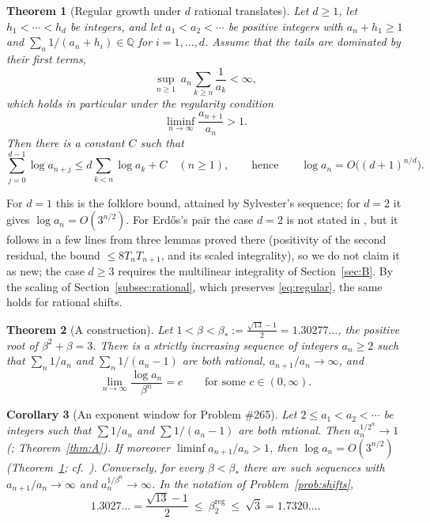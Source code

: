 \documentclass[11pt]{amsart}
\newtheorem{theorem}{Theorem}
\newtheorem{maincor}[theorem]{Corollary}
\theoremstyle{definition}
\theoremstyle{remark}
\newcommand{\Q}{\mathbb{Q}}
\begin{document}
\begin{theorem}[Regular growth under $d$ rational translates]\label{thm:B}
Let $d\ge1$, let $h_1<\cdots<h_d$ be integers, and let $a_1<a_2<\cdots$ be positive
integers with $a_n+h_1\ge1$ and $\sum_n 1/(a_n+h_i)\in\Q$ for $i=1,\dots,d$. Assume that the
tails are dominated by their first terms,
\begin{equation}\label{eq:tails}
\sup_{n\ge1}\ a_n\sum_{k\ge n}\frac1{a_k}<\infty ,
\end{equation}
which holds in particular under the regularity condition
\begin{equation}\label{eq:regular}
\liminf_{n\to\infty}\frac{a_{n+1}}{a_n}>1 .
\end{equation}
Then there is a constant $C$ such that
\[
\sum_{j=0}^{d-1}\log a_{n+j}\le d\sum_{k<n}\log a_k+C\quad(n\ge1),
\qquad\text{hence}\qquad \log a_n=O\bigl((d+1)^{n/d}\bigr).
\]
\end{theorem}

For $d=1$ this is the folklore bound, attained by Sylvester's sequence; for $d=2$ it
gives $\log a_n=O(3^{n/2})$. For Erd\H{o}s's pair the case $d=2$ is not stated in
\cite{Kit26}, but it follows in a few lines from three lemmas proved there (positivity of
the second residual, the bound $\le8T_nT_{n+1}$, and its scaled integrality), so we do not
claim it as new; the case $d\ge3$ requires the multilinear integrality of
Section~\ref{sec:B}. By the scaling of Section~\ref{subsec:rational}, which preserves
\eqref{eq:regular}, the same holds for rational shifts.

\begin{theorem}[A construction]\label{thm:C}
Let $1<\beta<\beta_*:=\frac{\sqrt{13}-1}{2}=1.30277\ldots$, the positive root of
$\beta^2+\beta=3$. There is a strictly increasing sequence of integers $a_n\ge2$ such
that $\sum_n1/a_n$ and $\sum_n1/(a_n-1)$ are both rational, $a_{n+1}/a_n\to\infty$, and
\[
\lim_{n\to\infty}\frac{\log a_n}{\beta^n}=c\qquad\text{for some }c\in(0,\infty).
\]
\end{theorem}

\begin{maincor}[An exponent window for Problem \#265]\label{cor:D}
Let $2\le a_1<a_2<\cdots$ be integers such that $\sum1/a_n$ and $\sum1/(a_n-1)$ are both
rational. Then $a_n^{1/2^n}\to 1$ \textup{(}\cite{Kit26}; Theorem~\ref{thm:A}\textup{)}.
If moreover $\liminf a_{n+1}/a_n>1$, then $\log a_n=O(3^{n/2})$ \textup{(}Theorem~\ref{thm:B};
cf.\ \cite{Kit26}\textup{)}. Conversely, for every
$\beta<\beta_*$ there are such sequences with $a_{n+1}/a_n\to\infty$ and
$a_n^{1/\beta^n}\to\infty$. In the notation of Problem~\ref{prob:shifts},
\[
1.3027\ldots=\frac{\sqrt{13}-1}{2}\ \le\ \beta^{\mathrm{reg}}_2\ \le\ \sqrt3=1.7320\ldots .
\]
\end{maincor}
\end{document}
